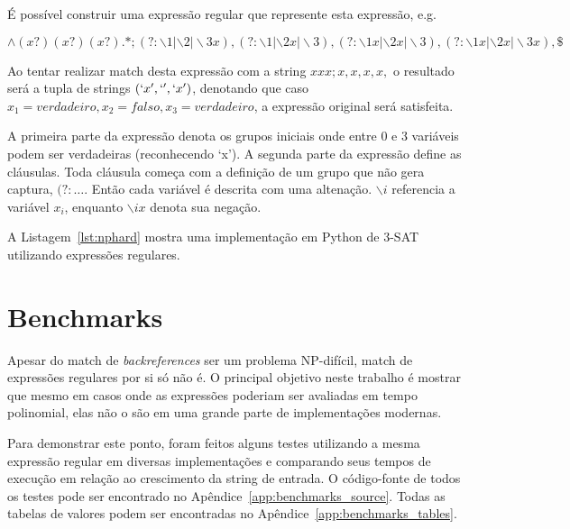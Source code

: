 \documentclass[a4paper,12pt,oneside,onecolumn]{uerj}
\begin{document}
É possível construir uma expressão regular que represente esta expressão, e.g.

\setlength\abovedisplayskip{0pt}
\begin{equation*}
\wedge (x?)(x?)(x?).*;
                   (?:\backslash 1|\backslash 2|\backslash 3x),
                   (?:\backslash 1|\backslash 2x|\backslash 3),
                   (?:\backslash 1x|\backslash 2x|\backslash 3),
                   (?:\backslash 1x|\backslash 2x|\backslash 3x), \$
\end{equation*}

Ao tentar realizar match desta expressão com a string $xxx;x,x,x,x,$ o resultado será a tupla de strings $(`x', `', `x')$, denotando que caso $x_1 = verdadeiro, x_2 = falso, x_3 = verdadeiro$, a expressão original será satisfeita.

A primeira parte da expressão denota os grupos iniciais onde entre 0 e 3 variáveis podem ser verdadeiras (reconhecendo `x'). A segunda parte da expressão define as cláusulas. Toda cláusula começa com a definição de um grupo que não gera captura, $(?:\ldots$. Então cada variável é descrita com uma altenação. $\backslash i$ referencia a variável $x_i$, enquanto $\backslash ix$ denota sua negação.

A Listagem~\ref{lst:nphard} mostra uma implementação em Python de 3-SAT utilizando expressões regulares.

\vspace{0.5cm}


\section{Benchmarks}

Apesar do match de \emph{backreferences} ser um problema NP-difícil, match de expressões regulares por si só não é. O principal objetivo neste trabalho é mostrar que mesmo em casos onde as expressões poderiam ser avaliadas em tempo polinomial, elas não o são em uma grande parte de implementações modernas.

Para demonstrar este ponto, foram feitos alguns testes utilizando a mesma expressão regular em diversas implementações e comparando seus tempos de execução em relação ao crescimento da string de entrada. O código-fonte de todos os testes pode ser encontrado no Apêndice~\ref{app:benchmarks_source}. Todas as tabelas de valores podem ser encontradas no Apêndice~\ref{app:benchmarks_tables}.
\end{document}
